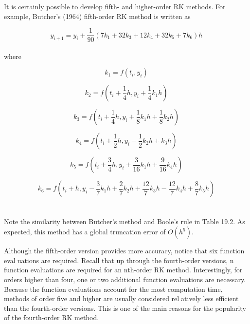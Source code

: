 \vspace{0.2in}
It is certainly possible to develop fifth- and higher-order RK methods. For example,
Butcher’s (1964) fifth-order RK method is written as

\begin{equation}
\tag{22.45}
y_{i+1} = y_i + \dfrac{1}{90}(7k_1 + 32k_3 + 12k_4 + 32k_5 + 7k_6)h
\end{equation}\\
where

\begin{equation}
\tag{22.45a}
k_1 = f(t_i,y_i)
\end{equation}

\begin{equation}
\tag{22.45b}
k_2 = f \left( t_i + \dfrac{1}{4}h, y_i + \dfrac{1}{4}k_1h \right)
\end{equation}

\begin{equation}
\tag{22.45c}
k_3 = f \left(t_i + \dfrac{1}{4}h, y_i + \dfrac{1}{8}k_1h+\dfrac{1}{8}k_2h \right)
\end{equation}

\begin{equation}
\tag{22.45d}
k_4 = f \left(t_i + \dfrac{1}{2}h, y_i - \dfrac{1}{2} k_2h + k_3h \right)
\end{equation}

\begin{equation}
\tag{22.45e}
k_5 = f \left(t_i + \dfrac{3}{4}h, y_i + \dfrac{3}{16}k_1h + \dfrac{9}{16}k_4h \right)
\end{equation}

\begin{equation}
\tag{22.45f}
k_6 = f \left( t_i + h, y_i - \dfrac{3}{7}k_1h + \dfrac{2}{7}k_2h + \dfrac{12}{7}k_3h - \dfrac{12}{7} k_4h + \dfrac{8}{7}k_5h \right)
\end{equation}\\
\\
Note the similarity between Butcher’s method and Boole’s rule in Table 19.2. As expected,
this method has a global truncation error of $O(h^5)$.

Although the fifth-order version provides more accuracy, notice that six function evaluations are required. Recall that up through the fourth-order versions, n function evaluations are required for an nth-order RK method. Interestingly, for orders higher than four, one or
two additional function evaluations are necessary. Because the function evaluations account
for the most computation time, methods of order five and higher are usually considered relatively less efficient than the fourth-order versions. This is one of the main reasons for the
popularity of the fourth-order RK method.


